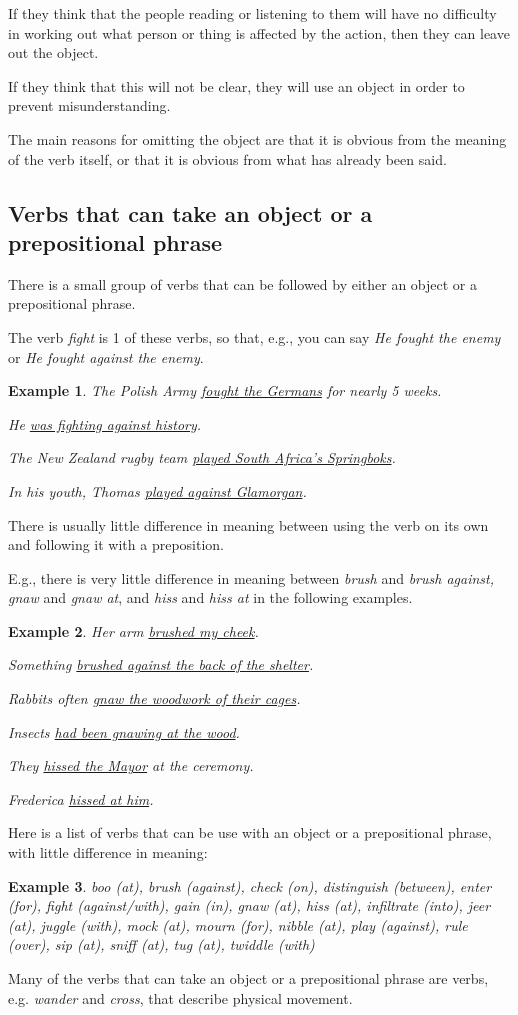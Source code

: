 \documentclass[oneside]{book}
\numberwithin{equation}{section}
\newtheorem{example}{Example}[section]
\begin{document}
If they think that the people reading or listening to them will have no difficulty in working out what person or thing is affected by the action, then they can leave out the object.

If they think that this will not be clear, they will use an object in order to prevent misunderstanding.

The main reasons for omitting the object are that it is obvious from the meaning of the verb itself, or that it is obvious from what has already been said.

\subsection{Verbs that can take an object or a prepositional phrase}
\noindent{} There is a small group of verbs that can be followed by either an object or a prepositional phrase.

The verb \textit{fight} is 1 of these verbs, so that, e.g., you can say \textit{He fought the enemy} or \textit{He fought against the enemy}.
\begin{example}
    The Polish Army \underline{fought the Germans} for nearly 5 weeks.
    
    He \underline{was fighting against history}.
    
    The New Zealand rugby team \underline{played South Africa's Springboks}.
    
    In his youth, Thomas \underline{played against Glamorgan}.
\end{example}
%
\noindent{} There is usually little difference in meaning between using the verb on its own and following it with a preposition.

E.g., there is very little difference in meaning between \textit{brush} and \textit{brush against, gnaw} and \textit{gnaw at}, and \textit{hiss} and \textit{hiss at} in the following examples.
\begin{example}
    Her arm \underline{brushed my cheek}.
    
    Something \underline{brushed against the back of the shelter}.
    
    Rabbits often \underline{gnaw the woodwork of their cages}.
    
    Insects \underline{had been gnawing at the wood}.
    
    They \underline{hissed the Mayor} at the ceremony.
    
    Frederica \underline{hissed at him}.
\end{example}
%
\noindent{} Here is a list of verbs that can be use with an object or a prepositional phrase, with little difference in meaning:
\begin{example}
    boo (at), brush (against), check (on), distinguish (between), enter (for), fight (against/with), gain (in), gnaw (at), hiss (at), infiltrate (into), jeer (at), juggle (with), mock (at), mourn (for), nibble (at), play (against), rule (over), sip (at), sniff (at), tug (at), twiddle (with)
\end{example}
%
\noindent{} Many of the verbs that can take an object or a prepositional phrase are verbs, e.g. \textit{wander} and \textit{cross}, that describe physical movement.
\end{document}
